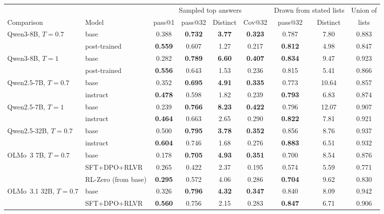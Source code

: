 \documentclass[wcp]{jmlr}
\begin{document}
\begin{table}[t]
\centering\small
\begin{adjustbox}{max width=\linewidth}
\begin{tabular}{llccccccc}
\toprule
 & & \multicolumn{4}{c}{Sampled top answers} & \multicolumn{2}{c}{Drawn from stated lists} & Union of \\
Comparison & Model & pass@1 & pass@32 & Distinct & Cov@32 & pass@32 & Distinct & lists \\
\midrule
Qwen3-8B, $T{=}0.7$ & base & 0.388 & \textbf{0.732} & \textbf{3.77} & \textbf{0.323} & 0.787 & 7.80 & 0.883 \\
 & post-trained & \textbf{0.559} & 0.607 & 1.27 & 0.217 & \textbf{0.812} & 4.98 & 0.847 \\
Qwen3-8B, $T{=}1$ & base & 0.282 & \textbf{0.789} & \textbf{6.60} & \textbf{0.407} & \textbf{0.834} & 9.47 & 0.923 \\
 & post-trained & \textbf{0.556} & 0.643 & 1.53 & 0.236 & 0.815 & 5.41 & 0.866 \\
Qwen2.5-7B, $T{=}0.7$ & base & 0.352 & \textbf{0.695} & \textbf{4.91} & \textbf{0.335} & 0.773 & 10.64 & 0.857 \\
 & instruct & \textbf{0.478} & 0.598 & 1.82 & 0.239 & \textbf{0.793} & 6.83 & 0.874 \\
Qwen2.5-7B, $T{=}1$ & base & 0.239 & \textbf{0.766} & \textbf{8.23} & \textbf{0.422} & 0.796 & 12.07 & 0.907 \\
 & instruct & \textbf{0.464} & 0.663 & 2.65 & 0.290 & \textbf{0.822} & 7.81 & 0.921 \\
Qwen2.5-32B, $T{=}0.7$ & base & 0.500 & \textbf{0.795} & \textbf{3.78} & \textbf{0.352} & 0.856 & 8.76 & 0.937 \\
 & instruct & \textbf{0.604} & 0.746 & 1.68 & 0.276 & \textbf{0.883} & 6.51 & 0.932 \\
\midrule
OLMo~3 7B, $T{=}0.7$ & base & 0.178 & \textbf{0.705} & \textbf{4.93} & \textbf{0.351} & 0.700 & 8.54 & 0.876 \\
 & SFT+DPO+RLVR & 0.265 & 0.422 & 2.37 & 0.195 & 0.574 & 5.59 & 0.771 \\
 & RL-Zero (from base) & \textbf{0.295} & 0.572 & 4.06 & 0.286 & \textbf{0.704} & 9.62 & 0.830 \\
OLMo~3.1 32B, $T{=}0.7$ & base & 0.326 & \textbf{0.796} & \textbf{4.32} & \textbf{0.347} & 0.840 & 8.09 & 0.942 \\
 & SFT+DPO+RLVR & \textbf{0.560} & 0.756 & 2.15 & 0.283 & \textbf{0.847} & 6.71 & 0.906 \\

\end{tabular}
\end{adjustbox}
\end{table}
\end{document}
